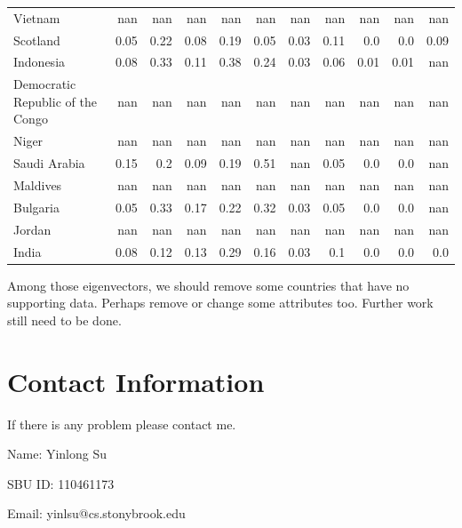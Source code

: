 \documentclass[11pt]{article}
\begin{document}
\begin{center}
\begin{longtable}{|p{70pt}|r|r|r|r|r|r|r|r|r|r|}
Vietnam& nan& nan& nan& nan& nan& nan& nan& nan& nan& nan\\
Scotland& 0.05& 0.22& 0.08& 0.19& 0.05& 0.03& 0.11& 0.0& 0.0& 0.09\\
Indonesia& 0.08& 0.33& 0.11& 0.38& 0.24& 0.03& 0.06& 0.01& 0.01& nan\\
Democratic Republic of the Congo& nan& nan& nan& nan& nan& nan& nan& nan& nan& nan\\
Niger& nan& nan& nan& nan& nan& nan& nan& nan& nan& nan\\
Saudi Arabia& 0.15& 0.2& 0.09& 0.19& 0.51& nan& 0.05& 0.0& 0.0& nan\\
Maldives& nan& nan& nan& nan& nan& nan& nan& nan& nan& nan\\
Bulgaria& 0.05& 0.33& 0.17& 0.22& 0.32& 0.03& 0.05& 0.0& 0.0& nan\\
Jordan& nan& nan& nan& nan& nan& nan& nan& nan& nan& nan\\
India& 0.08& 0.12& 0.13& 0.29& 0.16& 0.03& 0.1& 0.0& 0.0& 0.0\\

\hline

\end{longtable}
\end{center}

\par
Among those eigenvectors, we should remove some countries that have no supporting data. Perhaps remove or change some attributes too. Further work still need to be done.

\section{Contact Information}
If there is any problem please contact me.
\par
Name: Yinlong Su
\par
SBU ID: 110461173
\par
Email: yinlsu@cs.stonybrook.edu
\end{document}
